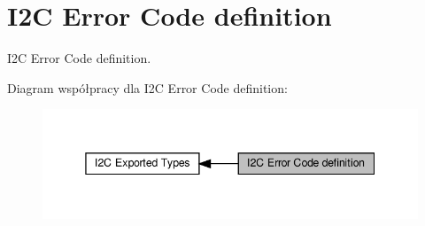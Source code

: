 \hypertarget{group___i2_c___error___code__definition}{}\section{I2C Error Code definition}
\label{group___i2_c___error___code__definition}


I2C Error Code definition.  


Diagram współpracy dla I2C Error Code definition\+:\nopagebreak
\begin{figure}[H]
\begin{center}
\leavevmode
\includegraphics[width=345pt]{group___i2_c___error___code__definition}
\end{center}
\end{figure}
